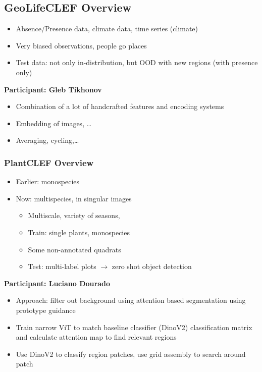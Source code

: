 \documentclass[a4paper]{article}
\begin{document}
\subsection{GeoLifeCLEF Overview}
\begin{itemize}
    \item Absence/Presence data, climate data, time series (climate)
    \item Very biased observations, people go places
    \item Test data: not only in-distribution, but OOD with new regions (with presence only)
\end{itemize}
\textbf{Participant: Gleb Tikhonov}
\begin{itemize}
    \item Combination of a lot of handcrafted features and encoding systems
    \item Embedding of images, \dots
    \item Averaging, cycling,\dots
\end{itemize}
\subsubsection{PlantCLEF Overview}
\begin{itemize}
    \item Earlier: monospecies
    \item Now: multispecies, in singular images
          \begin{itemize}
              \item Multiscale, variety of seasons,
              \item Train: single plants, monospecies
              \item Some non-annotated quadrats
              \item Test: multi-label plots $\rightarrow$ zero shot object detection
          \end{itemize}
\end{itemize}

\textbf{Participant: Luciano Dourado}
\begin{itemize}
    \item Approach: filter out background using attention based segmentation using prototype guidance
    \item Train narrow ViT to match baseline classifier (DinoV2) classification matrix and calculate attention map to find relevant regions
    \item Use DinoV2 to classify region patches, use grid assembly to search around patch
\end{itemize}
\end{document}
